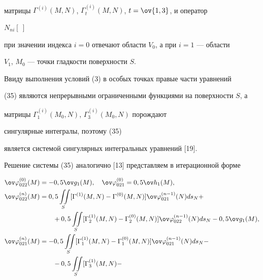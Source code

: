 \begin{pf}
\begin{gather*}
\end{gather*} 


матрицы $\Gamma^{(i)}(M,N)$, $\Gamma^{(i)}_t(M,N)$, $t=\ov{1,3}$, и оператор 


$N_{ni}[\ ]$ 


при значении индекса $i=0$ отвечают области $V_0$, а при $i=1$ --- области 


$V_1$, $M_0$ --- точки гладкости поверхности $S$. 


Ввиду выполнения условий (3) в особых точках правые части уравнений  


(35) являются непрерывными ограниченными функциями на поверхности $S$, а  


матрицы $\Gamma^{(i)}_1(M_0,N)$, $\Gamma^{(i)}_3(M_0,N)$ порождают 


сингулярные интегралы, поэтому (35)  


является системой сингулярных интегральных уравнений [19]. 


 


Решение системы (35) аналогично [13] представляем в итерационной форме 


\begin{align} 


\ov\varphi{}^{(0)}_{022}(M)&=-0,5\ov g_1(M),\quad 


\ov\varphi{}^{(0)}_{021}=0,5\ov h_1(M),\notag\\ 


% 


\ov\varphi{}^{(n)}_{022}(M)&=0,5\iint\limits_S[\Gamma^{(1)}(M,N)- 


\Gamma^{(0)}(M,N)]\ov\varphi{}^{(n-1)}_{021}(N)ds_N+\notag\\ 


%


&\qquad+0,5\iint\limits_S[\Gamma^{(1)}_2(M,N)- 


\Gamma^{(0)}_2(M,N)]\ov\varphi{}^{(n-1)}_{022}(N) 


ds_N-0,5\ov g_1(M),\notag \\ 


% 


\ov\varphi{}^{(n)}_{021}(M)&=-0,5\iint\limits_S[\Gamma^{(1)}_1(M,N)- 


\Gamma^{(0)}_1(M,N)]\ov\varphi{}^{(n-1)}_{021}(N)ds_N-\notag \\ 


% 


&\qquad-0,5\iint\limits_S[\Gamma^{(1)}_3(M,N)- 



\end{align}
\end{pf}
